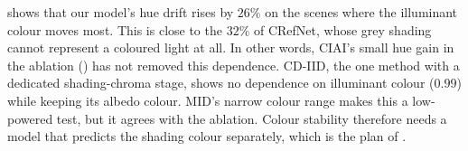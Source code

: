  shows that our model's hue drift rises by $26\%$ on the scenes where
the illuminant colour moves most. This is close to the $32\%$ of CRefNet, whose grey
shading cannot represent a coloured light at all. In other words, CIAI's small hue gain in the ablation
() has not removed this dependence. CD-IID, the one method with a
dedicated shading-chroma stage, shows no dependence on illuminant colour ($0.99$) while keeping
its albedo colour. MID's narrow colour range makes this a low-powered test, but it agrees with
the ablation. Colour stability therefore needs a model that predicts the shading colour
separately, which is the plan of .
